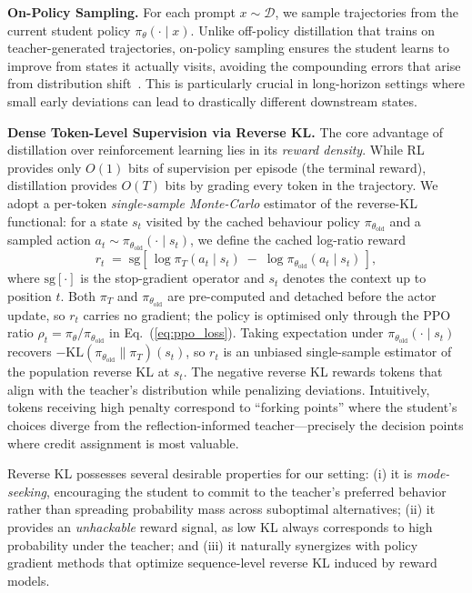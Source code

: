 \documentclass{article}
\theoremstyle{plain}
\theoremstyle{definition}
\theoremstyle{remark}
\begin{document}
\textbf{On-Policy Sampling.}
For each prompt $x\sim\mathcal{D}$, we sample trajectories from the current student policy $\pi_\theta(\cdot\mid x)$.
Unlike off-policy distillation that trains on teacher-generated trajectories, on-policy sampling ensures the student learns to improve from states it actually visits, avoiding the compounding errors that arise from distribution shift~\cite{ross2011reductionimitationlearningstructured}.
This is particularly crucial in long-horizon settings where small early deviations can lead to drastically different downstream states.

\textbf{Dense Token-Level Supervision via Reverse KL.}
The core advantage of distillation over reinforcement learning lies in its \emph{reward density}.
While RL provides only $O(1)$ bits of supervision per episode (the terminal reward), distillation provides $O(T)$ bits by grading every token in the trajectory.
We adopt a per-token \emph{single-sample Monte-Carlo} estimator of the reverse-KL functional: for a state $s_t$ visited by the cached behaviour policy $\pi_{\theta_{\mathrm{old}}}$ and a sampled action $a_t\sim\pi_{\theta_{\mathrm{old}}}(\cdot\mid s_t)$, we define the cached log-ratio reward
\begin{equation}
r_t \;=\; \mathrm{sg}\!\left[\,\log\pi_T(a_t\mid s_t)\;-\;\log\pi_{\theta_{\mathrm{old}}}(a_t\mid s_t)\,\right],
\label{eq:token_reward}
\end{equation}
where $\mathrm{sg}[\cdot]$ is the stop-gradient operator and $s_t$ denotes the context up to position $t$. Both $\pi_T$ and $\pi_{\theta_{\mathrm{old}}}$ are pre-computed and detached before the actor update, so $r_t$ carries no gradient; the policy is optimised only through the PPO ratio $\rho_t=\pi_\theta/\pi_{\theta_{\mathrm{old}}}$ in Eq.~(\ref{eq:ppo_loss}). Taking expectation under $\pi_{\theta_{\mathrm{old}}}(\cdot\mid s_t)$ recovers $-\mathrm{KL}\!\left(\pi_{\theta_{\mathrm{old}}}\!\parallel\!\pi_T\right)(s_t)$, so $r_t$ is an unbiased single-sample estimator of the population reverse KL at $s_t$.
The negative reverse KL rewards tokens that align with the teacher's distribution while penalizing deviations.
Intuitively, tokens receiving high penalty correspond to ``forking points'' where the student's choices diverge from the reflection-informed teacher—precisely the decision points where credit assignment is most valuable.

Reverse KL possesses several desirable properties for our setting:
(i) it is \emph{mode-seeking}, encouraging the student to commit to the teacher's preferred behavior rather than spreading probability mass across suboptimal alternatives;
(ii) it provides an \emph{unhackable} reward signal, as low KL always corresponds to high probability under the teacher; and
(iii) it naturally synergizes with policy gradient methods that optimize sequence-level reverse KL induced by reward models.
\end{document}
